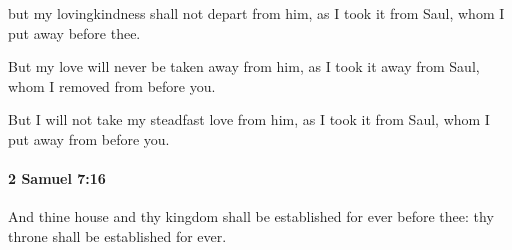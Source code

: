 			\begin{versebox}
					\item[BHS] 
					\item[ASV] but my lovingkindness shall not depart from him, as I took it from Saul, whom I put away before thee.
					\item[NIV] But my love will never be taken away from him, as I took it away from Saul, whom I removed from before you.
					\item[NRSV] But I will not take my steadfast love from him, as I took it from Saul, whom I put away from before you.
			\end{versebox}

		\paragraph{2 Samuel 7:16} %
			\label{2SAMUEL-7-16}

			And thine house and thy kingdom shall be established for ever before thee: thy throne shall be established for ever.

